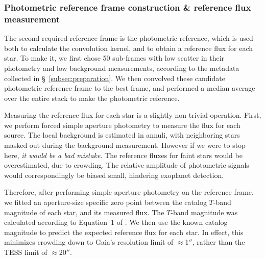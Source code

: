 \documentclass[12pt,twocolumn,tighten]{aastex62}
\begin{document}
\subsubsection{Photometric reference frame construction \& reference flux measurement}

The second required reference frame is the
photometric reference, which is used both to calculate the
convolution kernel, and to obtain a
reference flux for each star.  
To make it, we first chose 50
sub-frames with low scatter in their photometry
and low background measurements, according to the metadata collected
in \S~\ref{subsec:preparation}.
We then convolved these candidate photometric reference frame to the best
frame, and performed a median average over the entire stack
to make the photometric reference.


Measuring the reference flux for each star is a slightly non-trivial
operation.
First, we perform forced simple aperture photometry to measure
the flux for each source.
The local background is estimated in annuli, with neighboring stars
masked out during the background measurement.
However if we were to stop here, {\it it would be a bad mistake}.
The reference fluxes for faint stars would be overestimated, due to
crowding.
The relative amplitude of photometric signals would correspondingly
be biased small, hindering exoplanet detection.

Therefore, after performing simple aperture photometry on the 
reference frame, we fitted an aperture-size specific zero point
between the catalog $T$-band magnitude of each star, and its
measured flux.
The $T$-band magnitude was calculated according to Equation~1 of 
\citet{stassun_TIC8_2019}.
We then use the known catalog magnitude to predict the expected
reference flux for each star.
In effect, this minimizes crowding down to Gaia's resolution limit of
$\approx$1$''$, rather than the TESS limit of $\approx$20$''$.
\end{document}
